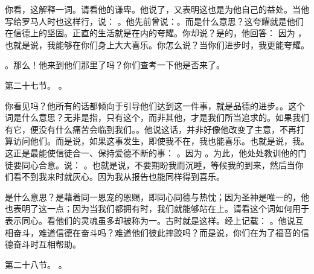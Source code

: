 你看，这解释一词。请看他的谦卑。他说了，又表明这也是为他自己的益处。当他写给罗马人时也这样行，说： 。他先前曾说：。而是什么意思？这夸耀就是他们在信德上的坚固。正直的生活就是在内的夸耀。你却说？是的，他回答：  因为 ，也就是说，我能够在你们身上大大喜乐。你怎么说？当你们进步时，我更能夸耀。\par

。那么！他来到他们那里了吗？你们查考一下他是否来了。\par

第二十七节。 。\par

你看见吗？他所有的话都倾向于引导他们达到这一件事，就是品德的进步。。这个词是什么意思？无非是指，只有这个，而非其他，才是我们所当追求的。如果我们有它，便没有什么痛苦会临到我们。。他说这话，并非好像他改变了主意，不再打算访问他们。而是说，如果这事发生，即使我不在，我也能喜乐。也就是说，我。这正是最能使信徒合一、保持爱德不断的事： 。因为 。为此，他处处教训他的门徒要同心合意。说： 。也就是说，不要期盼我而沉睡，等候我的到来，然后当你们看不到我来时就灰心。因为我从报告也能同样得到喜乐。\par

是什么意思？是藉着同一恩宠的恩赐，即同心同德与热忱；因为圣神是唯一的，他也表明了这一点；因为当我们都拥有时，我们就能够站在上。请看这个词如何用于表示同心。看他们的灵魂虽多却被称为一。古时就是这样。经上记载： 。他说互相奋斗，难道信德在奋斗吗？难道他们彼此摔跤吗？而是说，你们在为了福音的信德奋斗时互相帮助。\par

第二十八节。 。\par

